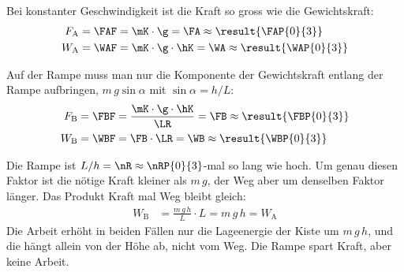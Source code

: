 \begin{abcliste}
\abc
Bei konstanter Geschwindigkeit ist die Kraft so gross wie die Gewichtskraft:
\begin{align}
 F_\mathrm{A} &= \FAF = \mK\cdot\g = \FA \approx \result{\FAP{0}{3}}\\
 W_\mathrm{A} &= \WAF = \mK\cdot\g\cdot\hK = \WA \approx \result{\WAP{0}{3}}
\end{align}

\abc
Auf der Rampe muss man nur die Komponente der Gewichtskraft entlang der Rampe aufbringen, $m\,g\sin\alpha$ mit $\sin\alpha = h/L$:
\begin{align}
 F_\mathrm{B} &= \FBF = \frac{\mK\cdot\g\cdot\hK}{\LR} = \FB \approx \result{\FBP{0}{3}}\\
 W_\mathrm{B} &= \WBF = \FB\cdot\LR = \WB \approx \result{\WBP{0}{3}}
\end{align}

\abc
Die Rampe ist $L/h = \nR \approx \nRP{0}{3}$-mal so lang wie hoch. Um genau diesen Faktor ist die nötige Kraft kleiner als $m\,g$, der Weg aber um denselben Faktor länger. Das Produkt Kraft mal Weg bleibt gleich:
\begin{align}
 W_\mathrm{B} &= \frac{m\,g\,h}{L}\cdot L = m\,g\,h = W_\mathrm{A}
\end{align}
Die Arbeit erhöht in beiden Fällen nur die Lageenergie der Kiste um $m\,g\,h$, und die hängt allein von der Höhe ab, nicht vom Weg. Die Rampe spart Kraft, aber keine Arbeit.
\end{abcliste}
